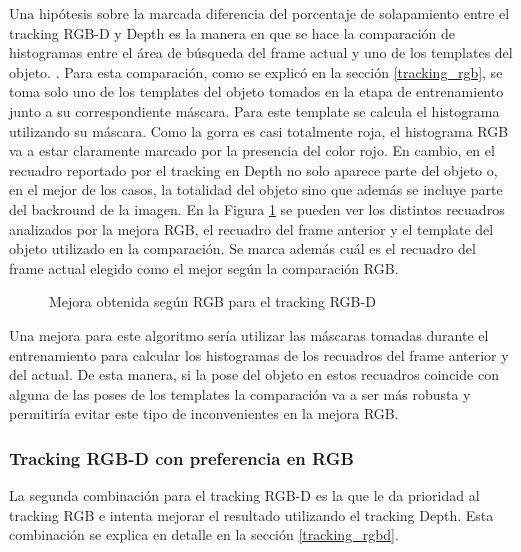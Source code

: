 Una hipótesis sobre la marcada diferencia del porcentaje de solapamiento entre el tracking RGB-D y Depth es la manera en que se hace la comparación de histogramas entre el área de búsqueda del frame actual y uno de los templates del objeto. . Para esta comparación, como se explicó en la sección \ref{tracking_rgb}, se toma solo uno de los templates del objeto tomados en la etapa de entrenamiento junto a su correspondiente máscara. Para este template se calcula el histograma utilizando su máscara. Como la gorra es casi totalmente roja, el histograma RGB va a estar claramente marcado por la presencia del color rojo. En cambio, en el recuadro reportado por el tracking en Depth no solo aparece parte del objeto o, en el mejor de los casos, la totalidad del objeto sino que además se incluye parte del backround de la imagen. En la Figura \ref{mejora_rgb_en_tracking_rgbd} se pueden ver los distintos recuadros analizados por la mejora RGB, el recuadro del frame anterior y el template del objeto utilizado en la comparación. Se marca además cuál es el recuadro del frame actual elegido como el mejor según la comparación RGB. 

\begin{figure}
	\caption{Mejora obtenida según RGB para el tracking RGB-D}
	\label{mejora_rgb_en_tracking_rgbd}
\end{figure}

Una mejora para este algoritmo sería utilizar las máscaras tomadas durante el entrenamiento para calcular los histogramas de los recuadros del frame anterior y del actual. De esta manera, si la pose del objeto en estos recuadros coincide con alguna de las poses de los templates la comparación va a ser más robusta y permitiría evitar este tipo de inconvenientes en la mejora RGB.

\subsubsection*{Tracking RGB-D con preferencia en RGB}
La segunda combinación para el tracking RGB-D es la que le da prioridad al tracking RGB e intenta mejorar el resultado utilizando el tracking Depth. Esta combinación se explica en detalle en la sección \ref{tracking_rgbd}.


